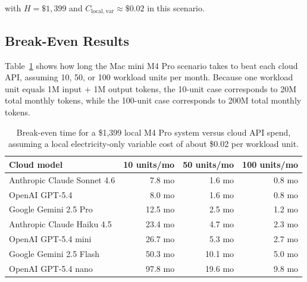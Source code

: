 \documentclass[11pt,a4paper]{article}
\begin{document}
with $H = \$1{,}399$ and $C_{\mathrm{local,var}} \approx \$0.02$ in this scenario.

\subsection{Break-Even Results}

Table~\ref{tab:breakeven_costs} shows how long the Mac mini M4 Pro scenario takes to beat each cloud API, assuming 10, 50, or 100 workload units per month. Because one workload unit equals 1M input + 1M output tokens, the 10-unit case corresponds to 20M total monthly tokens, while the 100-unit case corresponds to 200M total monthly tokens.

\begin{table}[t]
\centering
\small
\begin{tabular}{>{\raggedright\arraybackslash}p{3.0cm} r r r}
\toprule
\textbf{Cloud model} & \textbf{10 units/mo} & \textbf{50 units/mo} & \textbf{100 units/mo} \\
\midrule
Anthropic Claude Sonnet 4.6 & 7.8 mo & 1.6 mo & 0.8 mo \\
OpenAI GPT-5.4 & 8.0 mo & 1.6 mo & 0.8 mo \\
Google Gemini 2.5 Pro & 12.5 mo & 2.5 mo & 1.2 mo \\
Anthropic Claude Haiku 4.5 & 23.4 mo & 4.7 mo & 2.3 mo \\
OpenAI GPT-5.4 mini & 26.7 mo & 5.3 mo & 2.7 mo \\
Google Gemini 2.5 Flash & 50.3 mo & 10.1 mo & 5.0 mo \\
OpenAI GPT-5.4 nano & 97.8 mo & 19.6 mo & 9.8 mo \\
\bottomrule
\end{tabular}
\caption{Break-even time for a \$1,399 local M4 Pro system versus cloud API spend, assuming a local electricity-only variable cost of about \$0.02 per workload unit.}
\label{tab:breakeven_costs}
\end{table}
\end{document}
